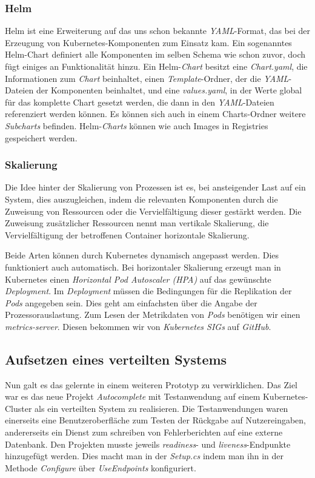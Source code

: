 \documentclass[12pt,a4paper]{scrartcl}
\begin{document}
\subsubsection{Helm}

Helm ist eine Erweiterung auf das uns schon bekannte \emph{YAML}-Format, das bei der Erzeugung von Kubernetes-Komponenten zum Einsatz kam. Ein sogenanntes Helm-Chart definiert alle Komponenten im selben Schema wie schon zuvor, doch fügt einiges an Funktionalität hinzu. Ein Helm-\emph{Chart} besitzt eine \emph{Chart.yaml}, die Informationen zum \emph{Chart} beinhaltet, einen \emph{Template}-Ordner, der die \emph{YAML}-Dateien der Komponenten beinhaltet, und eine \emph{values.yaml}, in der Werte global für das komplette Chart gesetzt werden, die dann in den \emph{YAML}-Dateien referenziert werden können. Es können sich auch in einem Charts-Ordner weitere \emph{Subcharts} befinden. Helm-\emph{Charts} können wie auch Images in Registries gespeichert werden.

\subsubsection{Skalierung} 

Die Idee hinter der Skalierung von Prozessen ist es, bei ansteigender Last auf ein System, dies auszugleichen, indem die relevanten Komponenten durch die Zuweisung von Ressourcen oder die Vervielfältigung dieser gestärkt werden.
Die Zuweisung zusätzlicher Ressourcen nennt man vertikale Skalierung, die Vervielfältigung der betroffenen Container horizontale Skalierung.

Beide Arten können durch Kubernetes dynamisch angepasst werden. Dies funktioniert auch automatisch. Bei horizontaler Skalierung erzeugt man in Kubernetes einen \emph{Horizontal Pod Autoscaler (HPA)} auf das gewünschte \emph{Deployment}. Im \emph{Deployment} müssen die Bedingungen für die Replikation der \emph{Pods} angegeben sein. Dies geht am einfachsten über die Angabe der Prozessorauslastung. Zum Lesen der Metrikdaten von \emph{Pods} benötigen wir einen \emph{metrics-server}. Diesen bekommen wir von \emph{Kubernetes SIGs} auf \emph{GitHub}.

\subsection{Aufsetzen eines verteilten Systems}

Nun galt es das gelernte in einem weiteren Prototyp zu verwirklichen. Das Ziel war es das neue Projekt \emph{Autocomplete} mit Testanwendung auf einem Kubernetes-Cluster als ein verteilten System zu realisieren. Die Testanwendungen waren einerseits eine Benutzeroberfläche zum Testen der Rückgabe auf Nutzereingaben, andererseits ein Dienst zum schreiben von Fehlerberichten auf eine externe Datenbank.
Den Projekten musste jeweils \emph{readiness}- und \emph{liveness}-Endpunkte hinzugefügt werden. Dies macht man in der \emph{Setup.cs} indem man ihn in der Methode \emph{Configure} über \emph{UseEndpoints} konfiguriert. 
\end{document}
